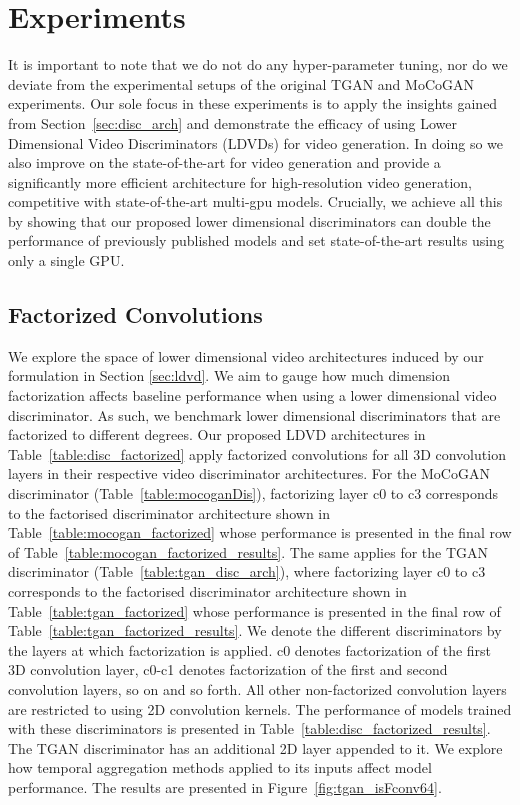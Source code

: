 \documentclass[a4paper,fleqn]{cas-sc}
\begin{document}
\section{Experiments}
\label{sec:experiments}
It is important to note that we do not do any hyper-parameter tuning, nor do we deviate from the experimental setups of the original TGAN and MoCoGAN experiments. Our sole focus in these experiments is to apply the insights gained from Section~\ref{sec:disc_arch} and demonstrate the efficacy of using Lower Dimensional Video Discriminators (LDVDs) for video generation. In doing so we also improve on the state-of-the-art for video generation and provide a significantly more efficient architecture for high-resolution video generation, competitive with state-of-the-art multi-gpu models. Crucially, we achieve all this by showing that our proposed lower dimensional discriminators can double the performance of previously published models and set state-of-the-art results using only a single GPU. 


\subsection{Factorized Convolutions}


We explore the space of lower dimensional video architectures induced by our formulation in Section \ref{sec:ldvd}. We aim to gauge how much dimension factorization affects baseline performance when using a lower dimensional video discriminator. As such, we benchmark lower dimensional discriminators that are factorized to different degrees. 
Our proposed LDVD architectures in Table~\ref{table:disc_factorized} apply factorized convolutions for all 3D convolution layers in their respective video discriminator architectures. For the MoCoGAN discriminator (Table~\ref{table:mocoganDis}), factorizing layer c0 to c3 corresponds to the factorised discriminator architecture shown in  Table~\ref{table:mocogan_factorized} whose performance is presented in the final row of Table~\ref{table:mocogan_factorized_results}. The same applies for the TGAN discriminator (Table~\ref{table:tgan_disc_arch}), where factorizing layer c0 to c3 corresponds to the factorised discriminator architecture shown in Table~\ref{table:tgan_factorized} whose performance is presented in the final row of Table~\ref{table:tgan_factorized_results}. We denote the different discriminators by the layers at which factorization is applied. c0 denotes factorization of the first 3D convolution layer, c0-c1 denotes factorization of the first and second convolution layers, so on and so forth. All other non-factorized convolution layers are restricted to using 2D convolution kernels. The performance of models trained with these discriminators is presented in Table~\ref{table:disc_factorized_results}. The TGAN discriminator has an additional 2D layer appended to it. We explore how temporal aggregation methods applied to its inputs affect model performance. The results are presented in Figure~\ref{fig:tgan_isFconv64}.
\end{document}
